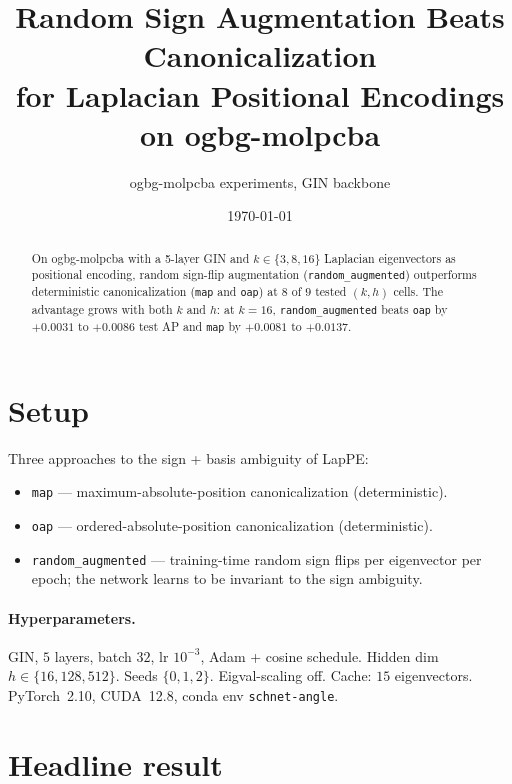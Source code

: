 \documentclass[11pt]{article}
\title{Random Sign Augmentation Beats Canonicalization\\
       for Laplacian Positional Encodings on ogbg-molpcba}
\author{ogbg-molpcba experiments, GIN backbone}
\date{\today}
\begin{document}
\maketitle

\begin{abstract}
On ogbg-molpcba with a 5-layer GIN and $k\!\in\!\{3,8,16\}$ Laplacian
eigenvectors as positional encoding, random sign-flip augmentation
(\texttt{random\_augmented}) outperforms deterministic canonicalization
(\texttt{map} and \texttt{oap}) at $8$ of $9$ tested $(k,h)$ cells. The
advantage grows with both $k$ and $h$: at $k\!=\!16$,
\texttt{random\_augmented} beats \texttt{oap} by $+0.0031$ to $+0.0086$
test AP and \texttt{map} by $+0.0081$ to $+0.0137$.
\end{abstract}

\section{Setup}

Three approaches to the sign + basis ambiguity of LapPE:
\begin{itemize}\itemsep0pt
\item \texttt{map} --- maximum-absolute-position canonicalization (deterministic).
\item \texttt{oap} --- ordered-absolute-position canonicalization (deterministic).
\item \texttt{random\_augmented} --- training-time random sign flips per
      eigenvector per epoch; the network learns to be invariant to the
      sign ambiguity.
\end{itemize}

\paragraph{Hyperparameters.} GIN, $5$ layers, batch $32$, lr $10^{-3}$,
Adam + cosine schedule. Hidden dim $h\!\in\!\{16, 128, 512\}$. Seeds
$\{0,1,2\}$. Eigval-scaling off. Cache: $15$ eigenvectors. PyTorch~2.10,
CUDA~12.8, conda env \texttt{schnet-angle}.

\section{Headline result}
\end{document}
